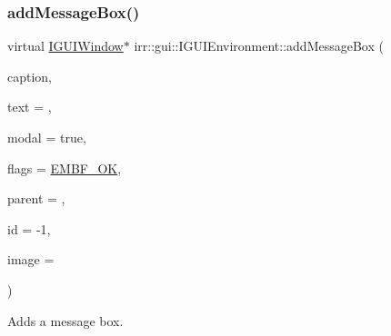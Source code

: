 \subsubsection{\texorpdfstring{add\+Message\+Box()}{addMessageBox()}}
{\footnotesize\ttfamily virtual \hyperlink{classirr_1_1gui_1_1IGUIWindow}{I\+G\+U\+I\+Window}$\ast$ irr\+::gui\+::\+I\+G\+U\+I\+Environment\+::add\+Message\+Box (\begin{DoxyParamCaption}\item[{const wchar\+\_\+t $\ast$}]{caption,  }\item[{const wchar\+\_\+t $\ast$}]{text = {},  }\item[{bool}]{modal = {\ttfamily true},  }\item[{\hyperlink{namespaceirr_ac66849b7a6ed16e30ebede579f9b47c6}{s32}}]{flags = {\ttfamily \hyperlink{namespaceirr_1_1gui_af55112e55731c9ad1b9fe9b372c521afaa3ffecf59885ff91a925aa3e27269db9}{E\+M\+B\+F\+\_\+\+OK}},  }\item[{\hyperlink{classirr_1_1gui_1_1IGUIElement}{I\+G\+U\+I\+Element} $\ast$}]{parent = {},  }\item[{\hyperlink{namespaceirr_ac66849b7a6ed16e30ebede579f9b47c6}{s32}}]{id = {\ttfamily -\/1},  }\item[{\hyperlink{classirr_1_1video_1_1ITexture}{video\+::\+I\+Texture} $\ast$}]{image = {} }\end{DoxyParamCaption})\hspace{0.3cm}{\ttfamily [pure virtual]}}



Adds a message box. 


